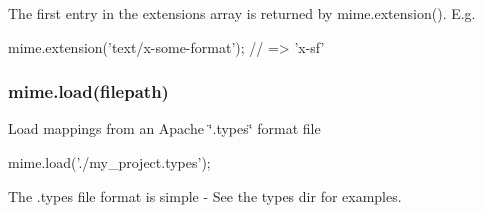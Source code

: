 The first entry in the extensions array is returned by {\ttfamily mime.\+extension()}. E.\+g.


\begin{DoxyCode}
mime.extension(\textcolor{stringliteral}{'text/x-some-format'}); \textcolor{comment}{// => 'x-sf'}
\end{DoxyCode}


\subsubsection*{mime.\+load(filepath)}

Load mappings from an Apache \char`\"{}.\+types\char`\"{} format file


\begin{DoxyCode}
mime.load(\textcolor{stringliteral}{'./my\_project.types'});
\end{DoxyCode}
 The .types file format is simple -\/ See the {\ttfamily types} dir for examples. 